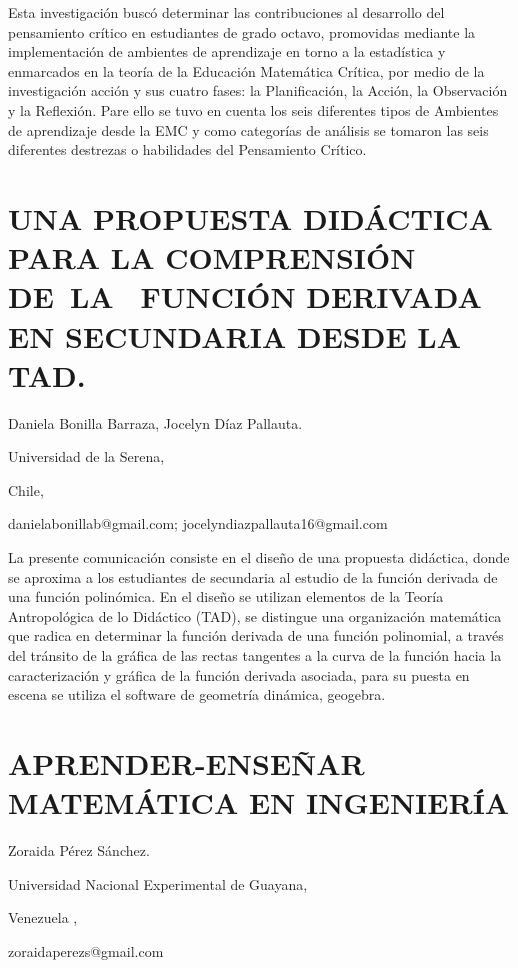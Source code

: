 Esta investigación buscó determinar las contribuciones al desarrollo
del pensamiento crítico en estudiantes de grado octavo, promovidas
mediante la implementación de ambientes de aprendizaje en torno a
la estadística y enmarcados en la teoría de la Educación Matemática
Crítica, por medio de la investigación acción y sus cuatro fases:
la Planificación, la Acción, la Observación y la Reflexión. Pare ello
se tuvo en cuenta los seis diferentes tipos de Ambientes de aprendizaje
desde la EMC y como categorías de análisis se tomaron las seis diferentes
destrezas o habilidades del Pensamiento Crítico.


\section{UNA PROPUESTA DIDÁCTICA PARA LA COMPRENSIÓN DE LA  FUNCIÓN DERIVADA
EN SECUNDARIA DESDE LA TAD.}

\begin{datos}

Daniela Bonilla Barraza, Jocelyn Díaz Pallauta.

Universidad de la Serena,

Chile,

danielabonillab@gmail.com; jocelyndiazpallauta16@gmail.com

\end{datos}

La presente comunicación consiste en el diseño de una propuesta didáctica,
donde se aproxima a los estudiantes de secundaria al estudio de la
función derivada de una función polinómica. En el diseño se utilizan
elementos de la Teoría Antropológica de lo Didáctico (TAD), se distingue
una organización matemática que radica en determinar la función derivada
de una función polinomial, a través del tránsito de la gráfica de
las rectas tangentes a la curva de la función hacia la caracterización
y gráfica de la función derivada asociada, para su puesta en escena
se utiliza el software de geometría dinámica, geogebra. 


\section{APRENDER-ENSEÑAR MATEMÁTICA EN INGENIERÍA}

\begin{datos}

Zoraida Pérez Sánchez.

Universidad Nacional Experimental de Guayana,

Venezuela ,

zoraidaperezs@gmail.com

\end{datos}

